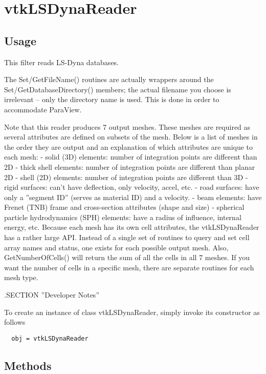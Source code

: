 \section{vtkLSDynaReader}

\subsection{Usage}

 This filter reads LS-Dyna databases.

 The Set/GetFileName() routines are actually wrappers around the
 Set/GetDatabaseDirectory() members; the actual filename you choose is
 irrelevant -- only the directory name is used.  This is done in order to
 accommodate ParaView.

 Note that this reader produces 7 output meshes.
 These meshes are required as several attributes are defined on subsets
 of the mesh.  Below is a list of meshes in the order they are output and
 an explanation of which attributes are unique to each mesh:
 - solid (3D) elements: number of integration points are different than 2D
 - thick shell elements: number of integration points are different than 
 planar 2D
 - shell (2D) elements: number of integration points are different than 3D
 - rigid surfaces: can't have deflection, only velocity, accel, etc.
 - road surfaces: have only a ''segment ID'' (serves as material ID) and a 
 velocity.
 - beam elements: have Frenet (TNB) frame and cross-section attributes 
 (shape and size)
 - spherical particle hydrodynamics (SPH) elements: have a radius of 
 influence, internal energy, etc.
 Because each mesh has its own cell attributes, the vtkLSDynaReader has a
 rather large API.  Instead of a single set of routines to query and set
 cell array names and status, one exists for each possible output mesh.
 Also, GetNumberOfCells() will return the sum of all the cells in all 7
 meshes.  If you want the number of cells in a specific mesh, there are
 separate routines for each mesh type.

 .SECTION ''Developer Notes''

To create an instance of class vtkLSDynaReader, simply
invoke its constructor as follows
\begin{verbatim}
  obj = vtkLSDynaReader
\end{verbatim}
\subsection{Methods}

